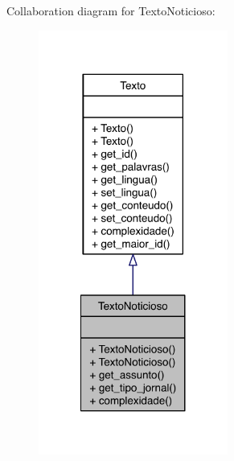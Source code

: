 Collaboration diagram for Texto\-Noticioso\-:
\nopagebreak
\begin{figure}[H]
\begin{center}
\leavevmode
\includegraphics[width=176pt]{class_texto_noticioso__coll__graph}
\end{center}
\end{figure}
